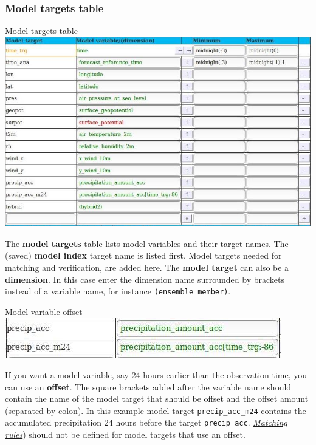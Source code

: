\documentclass[letterpaper,10pt,twoside,twocolumn,openany]{book}
\begin{document}
\subsubsection{Model targets table}
\begin{paperbox}{Model targets table}
  \includegraphics[width=\columnwidth]{coloc_model.jpg}
\end{paperbox}
The {\bf model targets} table lists model variables and their target names.
The (saved) {\bf model index} target name is listed first.
Model targets needed for matching and verification, are added here.
The {\bf model target} can also be a {\bf dimension}. 
In this case enter the dimension name surrounded by brackets instead of a variable name,
for instance \lstinline!(ensemble_member)!.
\begin{paperbox}{Model variable offset}
  \includegraphics[width=\columnwidth]{offset.jpg}
\end{paperbox}
If you want a model variable, say 24 hours earlier than the observation time, you can use an {\bf offset}.
The square brackets added after the variable name should contain the 
name of the model target that should be offset and the offset amount (separated by colon).
In this example model target \lstinline!precip_acc_m24! contains the accumulated precipitation 24 
hours before the target \lstinline!precip_acc!.
\hyperlink{matching}{\em Matching rules}) should not be defined for model targets that use an offset.
\end{document}
